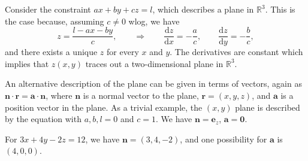 \documentclass[10pt,notitlepage]{revtex4-1}
\newcommand{\dfd}{\mathrm{d}}
\newenvironment{example}[1][Example]{\begin{trivlist}
\item[\hskip \labelsep {\bfseries #1}]}{\end{trivlist}}
\newcommand{\eb}{\boldsymbol{e}}
\newcommand{\ab}{{\boldsymbol{a}}}
\newcommand{\nb}{{\boldsymbol{n}}}
\begin{document}
Consider the constraint $ax+by+cz=l$, which describes a plane in $\mathbb{R}^3$.
This is the case because, assuming $c\neq0$ wlog, we have
\begin{equation}
	z=\frac{l-ax-by}{c},\qquad\Rightarrow\qquad
	\frac{\dfd z}{\dfd x}=-\frac{a}{c},\qquad\frac{\dfd z}{\dfd y}=-\frac{b}{c},
\end{equation}
and there exists a unique $z$ for every $x$ and $y$. The derivatives are
constant which implies that $z(x,y)$ traces out a two-dimensional plane in
$\mathbb{R}^3$.

An alternative description of the plane can be given in terms of vectors, again
as $\nb\cdot\boldsymbol{r}=\ab\cdot\nb$, where $\nb$ is a normal vector to the
plane, $\boldsymbol{r}=(x,y,z)$, and $\ab$ is a position vector in the plane. As
a trivial example, the $(x,y)$ plane is described by the equation with $a,b,l=0$
and $c=1$. We have $\nb=\eb_z$, $\ab=\boldsymbol{0}$.
\begin{example}
	For $3x+4y-2z=12$, we have $\nb=(3,4,-2)$, and one possibility for $\ab$ is
	$(4,0,0)$.
\end{example}
\end{document}
